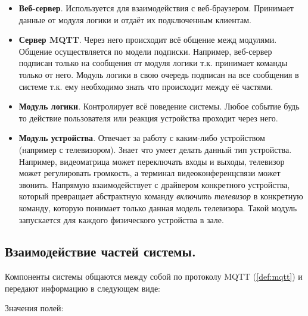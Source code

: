 \begin{itemize}
    \item \textbf{Веб-сервер}. Используется для взаимодействия с веб-браузером. Принимает данные от модуля логики и отдаёт
    их подключенным клиентам.
    \item \textbf{Сервер MQTT}. Через него происходит всё общение межд модулями. Общение осуществляется по модели подписки.
    Например, веб-сервер подписан только на сообщения от модуля логики т.к. принимает команды только от него. Модуль
    логики в свою очередь подписан на все сообщения в системе т.к. ему необходимо знать что происходит между её частями.
    \item \textbf{Модуль логики}. Контролирует всё поведение системы. Любое событие будь то действие пользователя или реакция
    устройства проходит через него.
    \item \textbf{Модуль устройства}. Отвечает за работу с каким-либо устройством (например с телевизором). Знает что умеет
    делать данный тип устройства. Например, видеоматрица может переключать входы и выходы, телевизор может регулировать
    громкость, а терминал видеоконференцсвязи может звонить. Напрямую взаимодействует с драйвером конкретного устройства,
    который превращает абстрактную команду \textit{включить телевизор} в конкретную команду, которую понимает только данная
    модель телевизора. Такой модуль запускается для каждого физического устройства в зале.
\end{itemize}

\subsection{Взаимодействие частей системы.}

Компоненты системы общаются между собой по протоколу MQTT (\ref{def:mqtt}) и передают информацию в следующем виде:





\noindent Значения полей:

